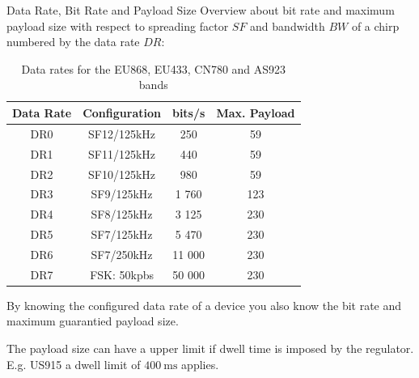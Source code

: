 \begin{frame}[t]{Data Rate, Bit Rate and Payload Size}
  Overview about \alert{bit rate} and \alert{maximum payload size} with respect to \alert{spreading factor} $SF$ and \alert{bandwidth} $BW$ of a chirp numbered by the \alert{data rate} $DR$:
  \begin{center}
    \begin{table}
      \begin{tabular}{c|c|c|c}
      \toprule
      Data Rate & Configuration & bits/s & Max. Payload \\
      \midrule
        DR0 & SF12/125kHz & 250 & 59\\
        DR1 & SF11/125kHz & 440 & 59\\
        DR2 & SF10/125kHz & 980 & 59\\
        DR3 & SF9/125kHz & 1 760 & 123\\
        DR4 & SF8/125kHz & 3 125 & 230\\
        DR5 & SF7/125kHz & 5 470 & 230\\
        DR6 & SF7/250kHz & 11 000 & 230\\
        DR7 & FSK: 50kpbs & 50 000 & 230
      \end{tabular}
    \caption{Data rates for the EU868, EU433, CN780 and AS923 bands}
    \end{table}%
  \end{center}%
  \begin{description}[$\Rightarrow$]
    \item[$\Rightarrow$] By knowing the configured \alert{data rate} of a device you also know the \alert{bit rate} and maximum \alert{guarantied payload size}.\\
    \item[$\Rightarrow$] The \alert{payload size} can have a \alert{upper limit} if \alert{dwell time} is imposed by the regulator. E.g. US915 a dwell limit of $\SI{400}{\milli\second}$ applies.
  \end{description}
\end{frame}
